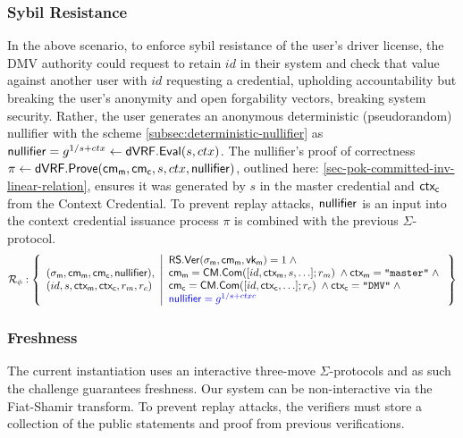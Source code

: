 \subsubsection*{Sybil Resistance}
In the above scenario, to enforce sybil resistance of the user's driver license, the DMV authority could request to retain $id$ in their system and check that value against another user with $id$ requesting a credential, upholding accountability but breaking the user's anonymity and open forgability vectors, breaking system security. Rather, the user generates an anonymous deterministic (pseudorandom) nullifier with the scheme \ref{subsec:deterministic-nullifier} as $\mathsf{nullifier} = g^{1/s + ctx} \gets \mathsf{dVRF.Eval}(s, ctx)$. The nullifier's proof of correctness $\pi \gets \mathsf{dVRF.Prove}(\mathsf{cm_m}, \mathsf{cm_c}, s, ctx, \mathsf{nullifier})$, outlined here: \ref{sec-pok-committed-inv-linear-relation}, ensures it was generated by $s$ in the master credential and $\mathsf{ctx_c}$ from the Context Credential. To prevent replay attacks, $\mathsf{nullifier}$ is an input into the context credential issuance process $\pi$ is combined with the previous $\Sigma$-protocol. 
\[
\mathcal{R}_{\phi}: \left\{ 
\begin{array}{l}
(\sigma_{\mathsf{m}}, \mathsf{cm_m}, \mathsf{cm_c}, \mathsf{nullifier}), \\
(id, s, \mathsf{ctx_m}, \mathsf{ctx_c}, r_m, r_c) 
\end{array}
\middle| 
\begin{array}{lcl}
    \mathsf{RS.Ver}(\sigma_{\mathsf{m}}, \mathsf{cm_m}, \mathsf{vk_m}) = 1 \; \wedge \; \\
    \mathsf{cm_m} = \mathsf{CM.Com}([id, \mathsf{ctx_m}, s, \ldots]; r_m) \; \wedge \mathsf{ctx_m} = \texttt{"master"} \; \wedge \; \\
    \mathsf{cm_c} = \mathsf{CM.Com}([id, \mathsf{ctx_c}, \ldots]; r_c) \; \wedge \mathsf{ctx_c} = \texttt{"DMV"} \; \wedge \; \\
    \textcolor{blue}{\mathsf{nullifier} = g^{1/s + ctxc}}
\end{array} \right\}
\]



\subsubsection*{Freshness}
The current instantiation uses an interactive three-move $\Sigma$-protocols and as such the challenge guarantees freshness. Our system can be non-interactive via the Fiat-Shamir transform. To prevent replay attacks, the verifiers must store a collection of the public statements and proof from previous verifications. 


